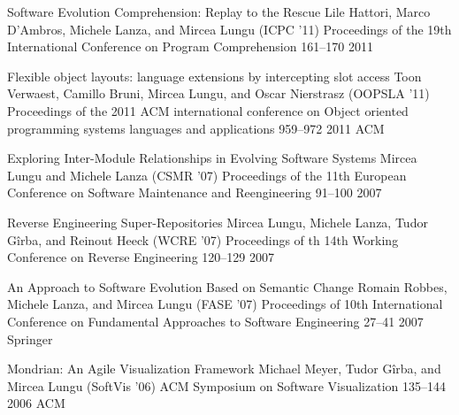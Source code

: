 \begin{enumerate}


\densepap
	{Software Evolution Comprehension: Replay to the Rescue}
	{Lile Hattori, Marco D'Ambros, Michele Lanza, and Mircea Lungu}
	{(ICPC '11) Proceedings of the 19th International Conference on Program Comprehension}
	{161--170}
	{2011}
	{\IEEE}



\densepap
	{Flexible object layouts: language extensions by intercepting slot access}
	{Toon Verwaest, Camillo Bruni, Mircea Lungu, and Oscar Nierstrasz}
	{(OOPSLA '11) Proceedings of the 2011 ACM international conference on Object oriented programming systems languages and applications }
	{959--972}
	{2011}
	{ACM}




\densepap
	{Exploring Inter-Module Relationships in Evolving Software Systems}
	{Mircea Lungu and Michele Lanza}
	{(CSMR '07) Proceedings of the 11th European Conference on Software Maintenance and Reengineering }
	{91--100}
	{2007}
	{\IEEE}

\densepap
	{Reverse Engineering Super-Repositories}
	{Mircea Lungu, Michele Lanza, Tudor G\^irba, and Reinout Heeck}
	{(WCRE '07) Proceedings of th 14th Working Conference on Reverse Engineering}
	{120--129}
	{2007}
	{\IEEE}

\densepap
	{An Approach to Software Evolution Based on Semantic Change}
	{Romain Robbes, Michele Lanza, and Mircea Lungu}
	{(FASE '07) Proceedings of 10th International Conference on Fundamental Approaches to Software Engineering}
	{27--41}
	{2007}
	{Springer}


\densepap
	{Mondrian: An Agile Visualization Framework}
	{Michael Meyer, Tudor G\^irba, and Mircea Lungu}
	{(SoftVis '06) ACM Symposium on Software Visualization}
	{135--144}
	{2006}
	{ACM}

\end{enumerate}